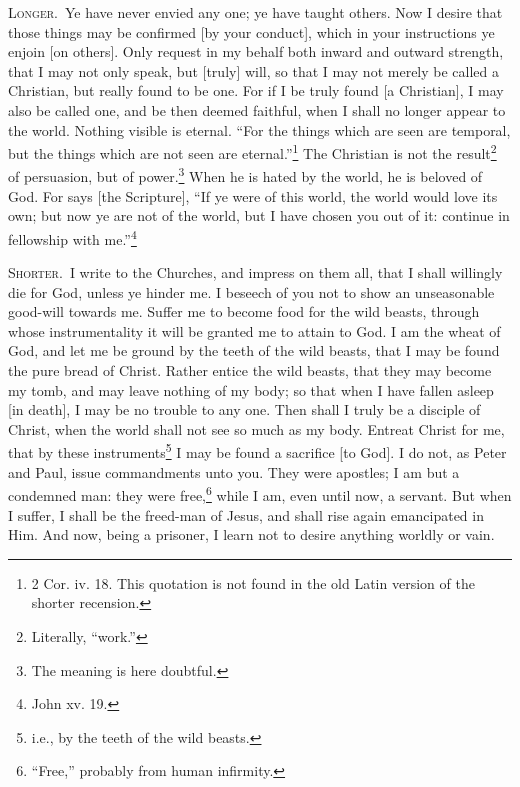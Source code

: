\textsc{Longer.}~Ye have never envied any one; ye have taught others. Now I desire that those things may be confirmed [by your conduct], which in your instructions ye enjoin [on others]. Only request in my behalf both inward and outward strength, that I may not only speak, but [truly] will, so that I may not merely be called a Christian, but really found to be one. For if I be truly found [a Christian], I may also be called one, and be then deemed faithful, when I shall no longer appear to the world. Nothing visible is eternal. “For the things which are seen are temporal, but the things which are not seen are eternal.”\footnote{2 Cor. iv. 18. This quotation is not found in the old Latin version of the shorter recension.} The Christian is not the result\footnote{Literally, “work.”} of persuasion, but of power.\footnote{The meaning is here doubtful.} When he is hated by the world, he is beloved of God. For says [the Scripture], “If ye were of this world, the world would love its own; but now ye are not of the world, but I have chosen you out of it: continue in fellowship with me.”\footnote{John xv. 19.}


\textsc{Shorter.}~I write to the Churches, and impress on them all, that I shall willingly die for God, unless ye hinder me. I beseech of you not to show an unseasonable good-will towards me. Suffer me to become food for the wild beasts, through whose instrumentality it will be granted me to attain to God. I am the wheat of God, and let me be ground by the teeth of the wild beasts, that I may be found the pure bread of Christ. Rather entice the wild beasts, that they may become my tomb, and may leave nothing of my body; so that when I have fallen asleep [in death], I may be no trouble to any one. Then shall I truly be a disciple of Christ, when the world shall not see so much as my body. Entreat Christ for me, that by these instruments\footnote{i.e., by the teeth of the wild beasts.} I may be found a sacrifice [to God]. I do not, as Peter and Paul, issue commandments unto you. They were apostles; I am but a condemned man: they were free,\footnote{“Free,” probably from human infirmity.} while I am, even until now, a servant. But when I suffer, I shall be the freed-man of Jesus, and shall rise again emancipated in Him. And now, being a prisoner, I learn not to desire anything worldly or vain.

